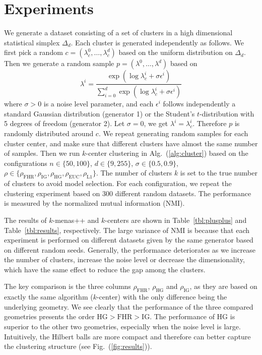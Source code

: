 \documentclass[graybox]{svmult}
\begin{document}
\section{Experiments}\label{sec:exp}
We generate a dataset consisting of a set of clusters in a high dimensional statistical simplex $\Delta_d$.
Each cluster is generated independently as follows. We first pick a
random $c=(\lambda_c^0,\ldots,\lambda_c^d)$ based on the uniform distribution on $\Delta_d$. Then
we generate a random sample $p=(\lambda^0,\ldots,\lambda^d)$ based on 
$$
\lambda^i = \frac{\exp(\log\lambda_c^i + \sigma\epsilon^i)}{\sum_{i=0}^d \exp(\log\lambda_c^i + \sigma\epsilon^i) }
$$
where $\sigma>0$ is a noise level parameter, and each $\epsilon^i$ follows independently
a standard Gaussian distribution (generator 1) or the Student's $t$-distribution
with 5 degrees of freedom (generator 2).
Let $\sigma=0$, we get $\lambda^i=\lambda_c^i$. Therefore $p$ is randomly distributed around $c$.
We repeat generating random samples for each cluster center, and make sure
that different clusters have almost the same number of samples. Then we run
$k$-center clustering in Alg.~(\ref{alg:cluster}) based on the configurations
$n\in\{50,100\}$, $d\in\{9,255\}$, $\sigma\in\{0.5,0.9\}$,
$\rho\in\{\rho_{\mathrm{FHR}}, \rho_{\mathrm{IG}}, \rho_{\mathrm{HG}},
\rho_{\mathrm{EUC}}, \rho_{\mathrm{L1}}\}$.
The number of clusters $k$ is set to the true number of clusters to avoid
model selection. For each
configuration, we repeat the clustering experiment based on 300 different random
datasets. The performance is measured by the normalized mutual information (NMI).

The results of $k$-menas++ and $k$-centers are shown in Table~\ref{tbl:plusplus}
and Table~\ref{tbl:results}, respectively. The large variance of NMI is because
that each experiment is performed on different
datasets given by the same generator based on different random seeds.
Generally, the performance deteriorates as we increase the number of clusters,
increase the noise level or decrease the dimensionality, 
which have the same effect to reduce the gap among the clusters.

The key comparison is the three columns $\rho_{\mathrm{FHR}}$, $\rho_{\mathrm{HG}}$
and $\rho_{\mathrm{IG}}$, as they are based on exactly the same algorithm
($k$-center) with the only difference being the underlying geometry.
We see clearly that the performance of the three compared geometries presents
the order $\mathrm{HG}>\mathrm{FHR}>\mathrm{IG}$.
The performance of HG is superior to the other two geometries, especially when the noise level is large.
Intuitively, the Hilbert balls are more compact and
therefore can better capture the clustering structure (see Fig.~(\ref{fig:results})).
\end{document}
